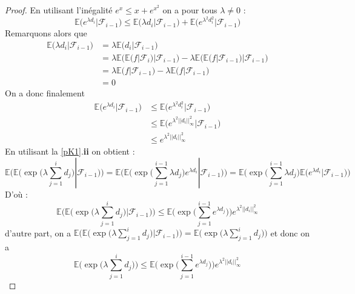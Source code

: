 \documentclass[12pt]{article}
\theoremstyle{definition}
\begin{document}
\begin{proof}
	En utilisant l'inégalité $e^x\leq x+e^{x^2}$ on a pour tous $\lambda\neq 0$ :
	\begin{equation*}
		\mathbb{E}\big(e^{\lambda d_i}|\mathcal{F}_{i-1}\big)\leq\mathbb{E}\big(\lambda d_i|\mathcal{F}_{i-1}\big)+\mathbb{E}\big(e^{\lambda^2 d_i^2}|\mathcal{F}_{i-1}\big)
	\end{equation*}
	Remarquons alors que 
	\begin{align*}
		\mathbb{E}\big(\lambda d_i|\mathcal{F}_{i-1}\big)&=\lambda \mathbb{E}\big( d_i|\mathcal{F}_{i-1}\big)\\
		&=\lambda\mathbb{E}\big( \mathbb{E}(f|\mathcal{F}_{i})|\mathcal{F}_{i-1}\big)-\lambda\mathbb{E}\big(\mathbb{E}(f|\mathcal{F}_{i-1})|\mathcal{F}_{i-1}\big)\\
		&=\lambda\mathbb{E}\big( f|\mathcal{F}_{i-1}\big)-\lambda\mathbb{E}\big(f|\mathcal{F}_{i-1}\big)\\
		&=0
	\end{align*}
	On a donc finalement 
	\begin{align*}
		\mathbb{E}\big(e^{\lambda d_i}|\mathcal{F}_{i-1}\big)&\leq\mathbb{E}\big(e^{\lambda^2 d_i^2}|\mathcal{F}_{i-1}\big)\\
		&\leq \mathbb{E}\big(e^{\lambda^2 ||d_i||_{\infty}^2}|\mathcal{F}_{i-1}\big)\\
		&\leq e^{\lambda^2 ||d_i||_{\infty}^2}
	\end{align*}
	En utilisant la \cref{pK1}.\textbf{ii} on obtient :
	\begin{equation*}
		\mathbb{E}\Bigg(\mathbb{E}\Big(\exp\big(\lambda\sum_{j=1}^{i}d_j\big)|\mathcal{F}_{i-1}\Big)\Bigg)= 
		\mathbb{E}\Bigg(\mathbb{E}\Big(\exp\big(\sum_{j=1}^{i-1}\lambda d_j\big)e^{\lambda d_i}|\mathcal{F}_{i-1}\Big)\Bigg)= 
		\mathbb{E}\Bigg(\exp\big(\sum_{j=1}^{i-1}\lambda d_j\big)\mathbb{E}\big(e^{\lambda d_i}|\mathcal{F}_{i-1}\big)\Bigg)
	\end{equation*}
	D'où :
	\begin{equation*}
		\mathbb{E}\Bigg(\mathbb{E}\Big(\exp\big(\lambda\sum_{j=1}^{i}d_j\big)|\mathcal{F}_{i-1}\Big)\Bigg)\leq \mathbb{E}\Bigg(\exp\big(\sum_{j=1}^{i-1}e^{\lambda d_j}\big)\Bigg)e^{\lambda^2 ||d_i||_{\infty}^2}
	\end{equation*}
	d'autre part, on a $\mathbb{E}\Bigg(\mathbb{E}\Big(\exp\big(\lambda\sum_{j=1}^{i}d_j\big)|\mathcal{F}_{i-1}\Big)\Bigg)=\mathbb{E}\Big(\exp\big(\lambda\sum_{j=1}^{i}d_j\big)\Big)$
	et donc on a 
	\begin{equation*}
		\mathbb{E}\Big(\exp\big(\lambda\sum_{j=1}^{i}d_j\big)\Big)\leq \mathbb{E}\Bigg(\exp\big(\sum_{j=1}^{i-1}e^{\lambda d_j}\big)\Bigg)e^{\lambda^2 ||d_i||_{\infty}^2}

\end{equation*}
\end{proof}
\end{document}
